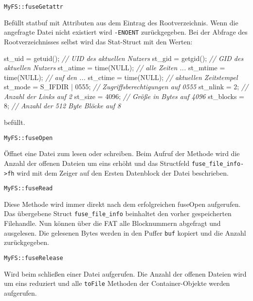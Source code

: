 \documentclass[]{article}
\newenvironment{Shaded}{}{}
\newcommand{\CommentTok}[1]{\textcolor[rgb]{0.38,0.63,0.69}{\textit{#1}}}
\newcommand{\DecValTok}[1]{\textcolor[rgb]{0.25,0.63,0.44}{#1}}
\newcommand{\NormalTok}[1]{#1}
\begin{document}
\texttt{MyFS::fuseGetattr}

Befüllt statbuf mit Attributen aus dem Eintrag des Rootverzeichnis. Wenn
die angefragte Datei nicht existiert wird \texttt{-ENOENT}
zurückgegeben. Bei der Abfrage des Rootverzeichnisses selbst wird das
Stat-Struct mit den Werten:

\begin{Shaded}
  \begin{framed}
\begin{Highlighting}[]
\NormalTok{st_uid = getuid();        }\CommentTok{// UID des aktuellen Nutzers}
\NormalTok{st_gid = getgid();        }\CommentTok{// GID des aktuellen Nutzers}
\NormalTok{st_atime = time(NULL);    }\CommentTok{// alle Zeiten ...}
\NormalTok{st_mtime = time(NULL);    }\CommentTok{// auf den ...}
\NormalTok{st_ctime = time(NULL);    }\CommentTok{// aktuellen Zeitstempel}
\NormalTok{st_mode = S_IFDIR | }\DecValTok{0555}\NormalTok{; }\CommentTok{// Zugriffsberechtigungen auf 0555}
\NormalTok{st_nlink = }\DecValTok{2}\NormalTok{;             }\CommentTok{// Anzahl der Links auf 2}
\NormalTok{st_size = }\DecValTok{4096}\NormalTok{;           }\CommentTok{// Größe in Bytes auf 4096}
\NormalTok{st_blocks = }\DecValTok{8}\NormalTok{;            }\CommentTok{// Anzahl der 512 Byte Blöcke auf 8}
\end{Highlighting}
\end{framed}
\end{Shaded}

befüllt.

\texttt{MyFS::fuseOpen}

Öffnet eine Datei zum lesen oder schreiben. Beim Aufruf der Methode wird
die Anzahl der offenen Dateien um eins erhöht und das Structfeld
\texttt{fuse\_file\_info-\textgreater{}fh} wird mit dem Zeiger auf den
Ersten Datenblock der Datei beschrieben.

\texttt{MyFS::fuseRead}

Diese Methode wird immer direkt nach dem erfolgreichen fuseOpen
aufgerufen. Das übergebene Struct \texttt{fuse\_file\_info} beinhaltet
den vorher gespeicherten Filehandle. Nun können über die FAT alle
Blocknummern abgefragt und ausgelesen. Die gelesenen Bytes werden in den
Puffer \texttt{buf} kopiert und die Anzahl zurückgegeben.

\texttt{MyFS::fuseRelease}

Wird beim schließen einer Datei aufgerufen. Die Anzahl der offenen
Dateien wird um eins reduziert und alle \texttt{toFile} Methoden der
Container-Objekte werden aufgerufen.
\end{document}
